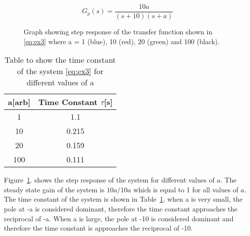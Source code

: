 \renewcommand{\ex}{ex3}

\begin{equation}
	G_{p}\left(s\right)=\frac{10a}{\left(s+10\right)\left(s+a\right)}
	\label{eq:\ex}
\end{equation}

\begin{figure}[ht!]
	\centering
	
	\caption{Graph showing step response of the transfer function shown in \eqref{eq:\ex} where a = 1 (blue), 10 (red), 20 (green) and 100 (black).\appendixamble{\ex}}
	\label{fig:\ex}
\end{figure}\FloatBarrier


\begin{table}[ht!]
	\centering
	\begin{tabular}{|c|c|}
		\hline
		a{[}arb{]} & Time Constant $\tau${[}s{]} \\ \hline
		1          & 1.1                         \\ \hline
		10         & 0.215                       \\ \hline
		20         & 0.159                       \\ \hline
		100        & 0.111                       \\ \hline
	\end{tabular}
    \caption{Table to show the time constant of the system \eqref{eq:\ex} for different values of a}\label{table:\ex}
\end{table}\FloatBarrier

Figure~\ref{fig:\ex}. shows the step response of the system for different values of $a$. The steady state gain of the system is $10a/10a$ which is equal to 1 for all values of $a$. The time constant of the system is shown in Table~\ref{table:\ex}. when a is very small, the pole at -a is considered dominant, therefore the time constant approaches the reciprocal of -a. When a is large, the pole at -10 is considered dominant and therefore the time constant is approaches the reciprocal of -10. \\
